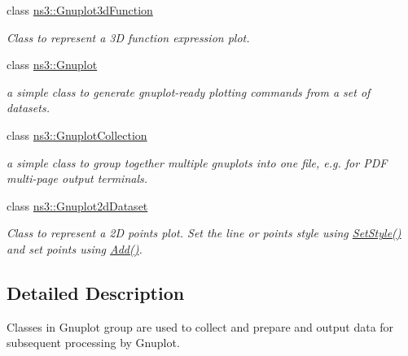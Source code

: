 \begin{DoxyCompactItemize}
class \hyperlink{classns3_1_1Gnuplot3dFunction}{ns3\+::\+Gnuplot3d\+Function}
\begin{DoxyCompactList}\small\item\em Class to represent a 3D function expression plot. \end{DoxyCompactList}\item 
class \hyperlink{classns3_1_1Gnuplot}{ns3\+::\+Gnuplot}
\begin{DoxyCompactList}\small\item\em a simple class to generate gnuplot-\/ready plotting commands from a set of datasets. \end{DoxyCompactList}\item 
class \hyperlink{classns3_1_1GnuplotCollection}{ns3\+::\+Gnuplot\+Collection}
\begin{DoxyCompactList}\small\item\em a simple class to group together multiple gnuplots into one file, e.\+g. for P\+DF multi-\/page output terminals. \end{DoxyCompactList}\item 
class \hyperlink{classns3_1_1Gnuplot2dDataset}{ns3\+::\+Gnuplot2d\+Dataset}
\begin{DoxyCompactList}\small\item\em Class to represent a 2D points plot. Set the line or points style using \hyperlink{classns3_1_1Gnuplot2dDataset_a7a3d6b6c2bd7d32a82f5715bae37c886}{Set\+Style()} and set points using \hyperlink{classns3_1_1Gnuplot2dDataset_abd93f7c8fa2d1ed643c09d7fb8d5ef27}{Add()}. \end{DoxyCompactList}\end{DoxyCompactItemize}


\subsection{Detailed Description}
Classes in Gnuplot group are used to collect and prepare and output data for subsequent processing by Gnuplot. 